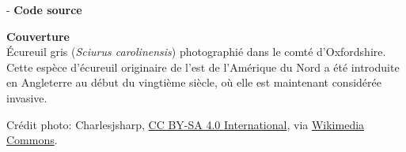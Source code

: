 \begin{adjustwidth*}{\unitlength}{-\unitlength}
  \textbf{Code source} \\
  \viewsource{\ghurl}

  \textbf{Couverture} \\
  Écureuil gris (\emph{Sciurus carolinensis}) photographié dans le
  comté d'Oxfordshire. Cette espèce d'écureuil
  originaire de l'est de l'Amérique du Nord a été introduite en
  Angleterre au début du vingtième siècle, où elle est maintenant
  considérée invasive.

  Crédit photo: {\textcopyright} Charlesjsharp,
  \href{https://creativecommons.org/licenses/by-sa/4.0/at/deed.fr}{CC
    BY-SA 4.0 International}, via
  \href{https://commons.wikimedia.org/w/index.php?curid=47900137}{Wikimedia
    Commons}.
\end{adjustwidth*}
\endgroup

